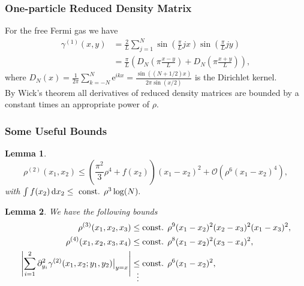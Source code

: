 \documentclass{beamer}[10]
\newcommand{\euler}[1]{\text{e}^{#1}}
\newcommand{\abs}[1]{\left\lvert #1 \right\rvert}
\newcommand*\diff{\mathop{}\!\mathrm{d}}
\newtheorem{mlemma}{Lemma}
\begin{document}
\begin{frame}
	\frametitle{One-particle Reduced Density Matrix}
	\begin{block}{}
		For the free Fermi gas we have
	\begin{equation}
	\begin{aligned}
	\gamma^{(1)}(x,y)&=\frac{2}{L}\sum_{j=1}^{N}\sin\left(\frac{\pi}{L}jx\right)\sin\left(\frac{\pi}{L} jy\right)\\
	&=\frac{\pi}{L}\left(D_{N}\left(\pi\frac{x-y}{L}\right)+D_{N}\left(\pi\frac{x+y}{L}\right)\right),
	\end{aligned}
	\end{equation}
	where $ D_N(x)=\frac{1}{2\pi}\sum_{k=-N}^{N}\euler{ikx}=\frac{\sin((N+1/2)x)}{2\pi\sin(x/2)} $ is the Dirichlet kernel.\\
	By Wick's theorem all derivatives of reduced density matrices are bounded by a constant times an appropriate power of $ \rho $.
		\end{block}	
	\end{frame}


\begin{frame}
	\frametitle{Some Useful Bounds}
	\begin{block}{}
		\vspace{-0.5cm}
		\footnotesize{\begin{mlemma}\label{Lemma rho2 bound}
			$$ \rho^{(2)}(x_1,x_2)\leq\left(\frac{\pi^2}{3}\rho^4+f(x_2)\right)(x_1-x_2)^2+\mathcal{O}(\rho^6(x_1-x_2)^4), $$ 
			with $ \int f(x_2)\diff x_2\leq \textnormal{ const. }\rho^3\log(N). $
		\end{mlemma}
			\begin{mlemma}\label{LemmaDensityBounds}
				We have the following bounds\begin{equation*}
				\begin{aligned}
				\rho^{(3)}(x_1,x_2,x_3)&\leq \textnormal{const. }\rho^9(x_1-x_2)^2(x_2-x_3)^2(x_1-x_3)^2,\\
				\rho^{(4)}(x_1,x_2,x_3,x_4)&\leq \textnormal{const. }\rho^8(x_1-x_2)^2(x_3-x_4)^2,\\
				\abs{\sum_{i=1}^{2}\partial_{y_i}^2\gamma^{(2)}(x_1,x_2;y_1,y_2)\big\rvert_{y=x}}&\leq \textnormal{const. } \rho^{6}(x_1-x_2)^2,\\[-3.2ex]
				&\ \ \vdots
				\end{aligned}
				\end{equation*}
			\end{mlemma}	}
	\end{block}	
\end{frame}
\end{document}
